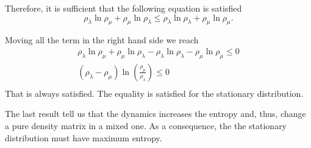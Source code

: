 Therefore, it is sufficient that the following equation is satisfied
\begin{equation}
    \rho_\lambda\ln\rho_\mu + \rho_\mu\ln\rho_\lambda\leq \rho_\lambda\ln\rho_\lambda+ \rho_\mu\ln\rho_\mu.
\end{equation}

Moving all the term in the right hand side we reach
\begin{equation}
    \begin{split}
        \rho_\lambda\ln\rho_\mu + \rho_\mu\ln\rho_\lambda - \rho_\lambda\ln\rho_\lambda- \rho_\mu\ln\rho_\mu \leq 0\\
        \left(\rho_\lambda-\rho_\mu\right)\ln\left(\frac{\rho_\mu}{\rho_\lambda}\right) \leq0\\
    \end{split}
\end{equation}
That is always satisfied. The equality is satisfied for the stationary distribution.

The last result tell us that the dynamics increases the entropy and, thus, change a pure density matrix in a mixed one.
As a consequence, the the stationary distribution must have maximum entropy.